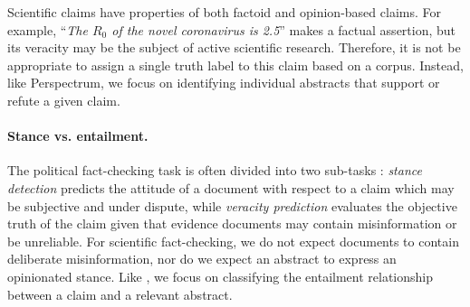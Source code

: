 Scientific claims have properties of both factoid and opinion-based claims. For example, ``\emph{The $R_0$ of the novel coronavirus is 2.5}'' makes a factual assertion, but its veracity may be the subject of active scientific research. Therefore, it is not be appropriate to assign a single truth label to this claim based on a corpus. Instead, like Perspectrum, we focus on identifying individual abstracts that support or refute a given claim.

\paragraph{Stance vs. entailment.}


The political fact-checking task is often divided into two sub-tasks \cite{derczynski-etal-2017-semeval}: \emph{stance detection} predicts the attitude of a document with respect to a claim which may be subjective and under dispute, while \emph{veracity prediction} evaluates the objective truth of the claim given that evidence documents may contain misinformation or be unreliable. For scientific fact-checking, we do not expect documents to contain deliberate misinformation, nor do we expect an abstract to express an opinionated stance. Like \fever, we focus on classifying the entailment relationship between a claim and a relevant abstract.








